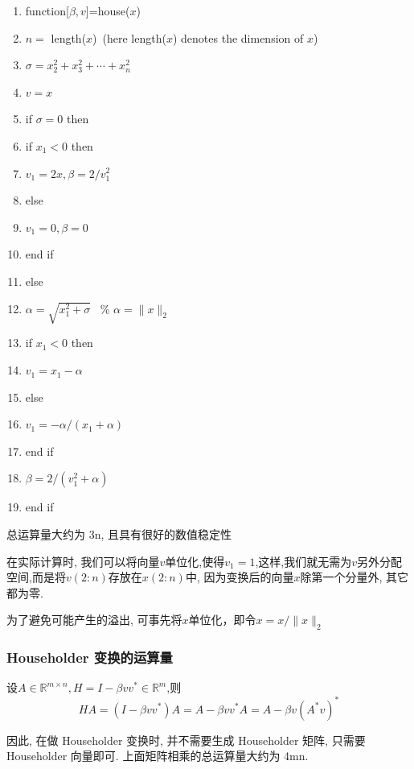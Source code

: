 \documentclass[notheorems,serif]{beamer}
\begin{document}
\begin{enumerate}[1:]
	\item function[$\beta,v$]=house($x$)
	\item $n=$ length($x$)~(here length($x$) denotes the dimension of $x$)
	\item $\sigma=x_{2}^{2}+x_{3}^{2}+\cdots+x_{n}^{2}$
	\item $v=x$
	\item if $\sigma=0$ then
	\item        \qquad if $x_1<0$ then
	\item \qquad \qquad$v_1=2x,\beta=2/v_1^2$
	\item \qquad else
	\item \qquad \qquad $v_1=0,\beta=0$
	\item\qquad end if
	\item else
	\item \qquad $\alpha=\sqrt{x_1^2+\sigma}$ ~\% $\alpha =\|x\|_2$
	\item \qquad if $x_1<0$ then
	\item \qquad \qquad $v_1=x_1-\alpha$
	\item \qquad else
	\item \qquad \qquad $v_1=-\alpha/(x_1+\alpha)$
	\item \qquad end if 
	\item \qquad $\beta=2/(v_1^2+\alpha)$
	\item end if 
\end{enumerate}

总运算量大约为 3n, 且具有很好的数值稳定性

在实际计算时, 我们可以将向量$v$单位化,使得$v_1=1$,这样,我们就无需为$v$另外分配空间,而是将$v(2:n)$存放在$x(2:n)$中, 因为变换后的向量$x$除第一个分量外, 其它都为零.

为了避免可能产生的溢出, 可事先将$x$单位化，即令$x=x/\|x\|_2$


\begin{frame}
\frametitle{Householder 变换的运算量}
设$A \in \mathbb{R}^{m \times n}, H=I-\beta v v^{*} \in \mathbb{R}^{m}$,则$$
H A=\left(I-\beta v v^{*}\right) A=A-\beta v v^{*} A=A-\beta v\left(A^{*} v\right)^{*}
$$

因此, 在做 Householder 变换时, 并不需要生成 Householder 矩阵, 只需要
Householder 向量即可. 上面矩阵相乘的总运算量大约为 4mn.
\end{frame}
\end{document}
